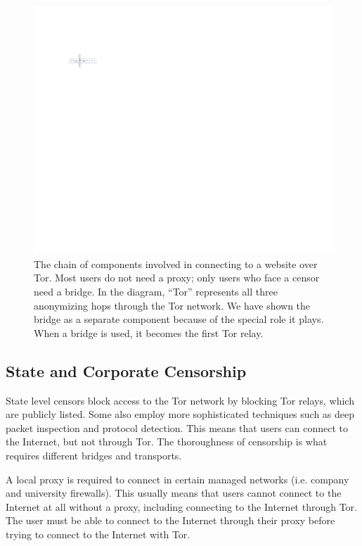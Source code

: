 \documentclass[USenglish,oneside,twocolumn]{article}
\begin{document}
\begin{figure}
\centering
\includegraphics{topology.pdf}
\caption{
The chain of components involved in connecting to a website over Tor.
Most users do not need a proxy;
only users who face a censor need a bridge.
In the diagram, ``Tor'' represents all three anonymizing hops through the Tor network.
We have shown the bridge as a separate component
because of the special role it plays.
When a bridge is used, it becomes the first Tor relay.
}
\label{fig:topology}
\end{figure}

\subsection{State and Corporate Censorship}
State level censors block access to the Tor network by blocking Tor relays, which are publicly listed. Some also employ more sophisticated techniques such as deep packet inspection and protocol detection. This means that users can connect to the Internet, but not through Tor. The thoroughness of censorship is what requires different bridges and transports. 

A local proxy is required to connect in certain managed networks (i.e. company and university firewalls). This usually means that users cannot connect to the Internet at all without a proxy, including connecting to the Internet through Tor. The user must be able to connect to the Internet through their proxy before trying to connect to the Internet with Tor. 
\end{document}
